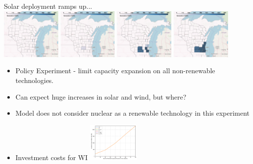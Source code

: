 \documentclass[xcolor=dvipsnames]{beamer}
\begin{document}
\begin{frame}
  Solar deployment ramps up... \\
  \includegraphics[width=0.22\textwidth]{includes/no_leakage_maxNR_solar_r0.png}
  \includegraphics[width=0.22\textwidth]{includes/no_leakage_maxNR_solar_r2.png}
  \includegraphics[width=0.22\textwidth]{includes/no_leakage_maxNR_solar_r3.png}
  \includegraphics[width=0.22\textwidth]{includes/no_leakage_maxNR_solar_r4.png}

\end{frame}

\begin{frame}

  \begin{itemize}
  \item Policy Experiment - limit capacity expansion on all non-renewable technologies.
  \item Can expect huge increases in solar and wind, but where?
  \item Model does not consider nuclear as a renewable technology in this experiment

  \item Investment costs for WI
    \includegraphics[width=0.2\textwidth]{includes/no_leakage_maxNR_invest_costs_by_region.png}

\end{itemize}
\end{frame}
\end{document}

